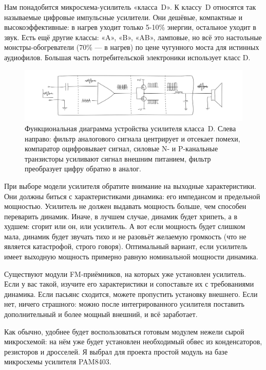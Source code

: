 Нам понадобится микросхема-усилитель «класса~D». К классу~D относятся так называемые цифровые импульсные усилители. Они дешёвые, компактные и высокоэффективные: в нагрев уходит только 5-10\% энергии, остальное уходит в звук. Есть ещё другие классы: «A», «B», «AB», ламповые, но всё это настольные монстры-обогреватели (70\% — в нагрев) по цене чугунного моста для истинных аудиофилов. Большая часть потребительской электроники использует класс D.

\begin{figure}
  \centering
  \includegraphics{sketches/sound-amp-class-d-diagram}
  \caption{Функциональная диаграмма устройства усилителя класса~D. Слева направо: фильтр аналогового сигнала центрирует и отсекает помехи, компаратор оцифровывает сигнал, силовые N- и P-канальные транзисторы усиливают сигнал внешним питанием, фильтр преобразует цифру обратно в аналог.}
  \label{fig:sound-amp-class-d-diagram}
\end{figure}

\begin{Caution}
  При выборе модели усилителя обратите внимание на выходные характеристики. Они должны биться с характеристиками динамика: его импедансом и предельной мощностью. Усилитель не должен выдавать мощность больше, чем способен переварить динамик. Иначе, в лучшем случае, динамик будет хрипеть, а в худшем: сгорит или он, или усилитель. А вот если мощность будет слишком мала, динамик будет звучать тихо и не разовьёт желаемую громкость (что не является катастрофой, строго говоря). Оптимальный вариант, если усилитель имеет выходную мощность примерно равную номинальной мощности динамика.
\end{Caution}

Существуют модули FM-приёмников, на которых уже установлен усилитель. Если у вас такой, изучите его характеристики и сопоставьте их с требованиями динамика. Если пасьянс сходится, можете пропустить установку внешнего. Если нет, ничего страшного: можно после интегрированного усилителя поставить дополнительный и более мощный внешний, и всё заработает.

Как обычно, удобнее будет воспользоваться готовым модулем нежели сырой микросхемой: на нём уже будет установлен необходимый обвес из конденсаторов, резисторов и дросселей. Я выбрал для проекта простой модуль на базе микросхемы усилителя PAM8403.

